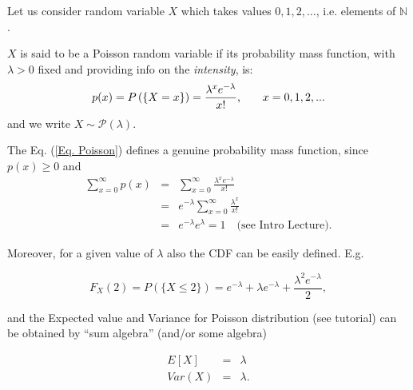 \documentclass[smaller]{beamer}\usepackage[]{graphicx}\usepackage[]{color}
\renewcommand{\Pr}{P}
\newcommand{\bea}{\begin{eqnarray}}
\newcommand{\eea}{\end{eqnarray}}
\newcommand{\nn}{\nonumber}
\begin{document}
\begin{frame}{\secname}


  \begin{definition}
  Let us consider random variable $X$ which takes values $0,1,2,\dots$, i.e. elements of $\mathbb{N}$.

  $X$ is said to be a Poisson random variable if its probability mass function, with $\lambda >0$ fixed and providing info on the \emph{intensity}, is:
  \begin{equation}
  p(x)=\Pr \left( \{ X = x \}\right) =\frac{\lambda ^{x}e^{-\lambda }}{x!}\text{,\qquad }%
  x=0,1,2,... \label{Eq. Poisson}
  \end{equation}
  and we write $X\sim \mathcal{P}(\lambda)$.
  \end{definition}
  \vspace{0.2cm}
  The Eq. (\ref{Eq. Poisson}) defines a genuine probability mass function, since $p(x) \geq 0$ and
  \bea
  \sum_{x=0}^{\infty} p(x) &=& \sum_{x=0}^{\infty}  \frac{\lambda ^{x}e^{-\lambda }}{x!}  \nn \\
  & = & e^{-\lambda } \sum_{x=0}^{\infty}   \frac{\lambda ^{x}}{x!} \nn \\
  & = & e^{-\lambda } e^{\lambda } = 1 \nn \quad \text{(see Intro Lecture).}
  \eea
\end{frame}%

\begin{frame}{\secname}

  Moreover, for a given value of $\lambda $ also the CDF can be easily defined. E.g.

  \begin{equation*}
  F_X(2)=\Pr \left( \{X\leq 2\}\right) =e^{-\lambda }+\lambda e^{-\lambda }+\frac{\lambda
  ^{2}e^{-\lambda }}{2},
  \end{equation*}

  and the Expected value and Variance for Poisson distribution (see tutorial) can be obtained by ``sum algebra'' (and/or some algebra)

  \begin{eqnarray*}
  E\left[ X\right] &=&\lambda \\
  Var\left( X\right) &=&\lambda.
  \end{eqnarray*}
\end{frame}
\end{document}
